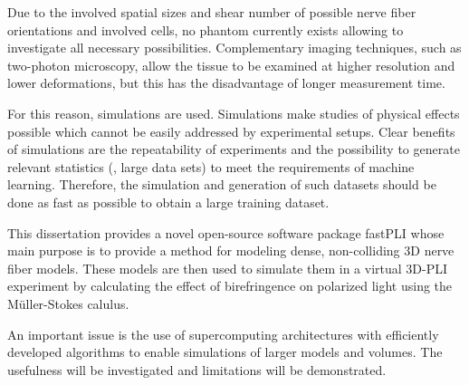 Due to the involved spatial sizes and shear number of possible nerve fiber orientations and involved cells, no phantom currently exists allowing to investigate all necessary possibilities.
Complementary imaging techniques, such as two-photon microscopy, allow the tissue to be examined at higher resolution and lower deformations, but this has the disadvantage of longer measurement time.
\par
% 
For this reason, simulations are used.
Simulations make studies of physical effects possible which cannot be easily addressed by experimental setups.
Clear benefits of simulations are the repeatability of experiments and the possibility to generate relevant statistics (\ie{}, large data sets) to meet \eg{} the requirements of machine learning.
Therefore, the simulation and generation of such datasets should be done as fast as possible to obtain a large training dataset. \\
\cite{Ginsburger2018, ginsburgerDis2019, Callaghan2019, Menzel2020}
\par
%
This dissertation provides a novel open-source software package \ac{fastPLI} whose main purpose is to provide a method for modeling dense, non-colliding 3D nerve fiber models.
These models are then used to simulate them in a virtual \ac{3D-PLI} experiment by calculating the effect of birefringence on polarized light using the M\"{u}ller-Stokes calulus. \\
\cite{Matuschke2019, Matuschke2021, Reuter2019}
\par
% 
An important issue is the use of supercomputing architectures with efficiently developed algorithms to enable simulations of larger models and volumes.
The usefulness will be investigated and limitations will be demonstrated.